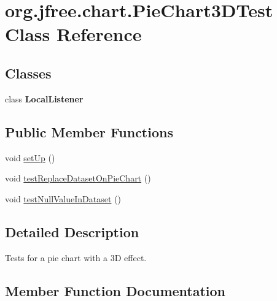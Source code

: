 \hypertarget{classorg_1_1jfree_1_1chart_1_1_pie_chart3_d_test}{}\section{org.\+jfree.\+chart.\+Pie\+Chart3\+D\+Test Class Reference}
\label{classorg_1_1jfree_1_1chart_1_1_pie_chart3_d_test}
\subsection*{Classes}
\begin{DoxyCompactItemize}
\item 
class {\bfseries Local\+Listener}
\end{DoxyCompactItemize}
\subsection*{Public Member Functions}
\begin{DoxyCompactItemize}
\item 
void \mbox{\hyperlink{classorg_1_1jfree_1_1chart_1_1_pie_chart3_d_test_a45340aa925ce36acadea92a239eb21b7}{set\+Up}} ()
\item 
void \mbox{\hyperlink{classorg_1_1jfree_1_1chart_1_1_pie_chart3_d_test_ac7a8ae83a66cd9387744cf6f51c3315f}{test\+Replace\+Dataset\+On\+Pie\+Chart}} ()
\item 
void \mbox{\hyperlink{classorg_1_1jfree_1_1chart_1_1_pie_chart3_d_test_a1e3c7600972cfdb1b2a619642fdb6692}{test\+Null\+Value\+In\+Dataset}} ()
\end{DoxyCompactItemize}


\subsection{Detailed Description}
Tests for a pie chart with a 3D effect. 

\subsection{Member Function Documentation}
\mbox{\label{classorg_1_1jfree_1_1chart_1_1_pie_chart3_d_test_a45340aa925ce36acadea92a239eb21b7}} 
